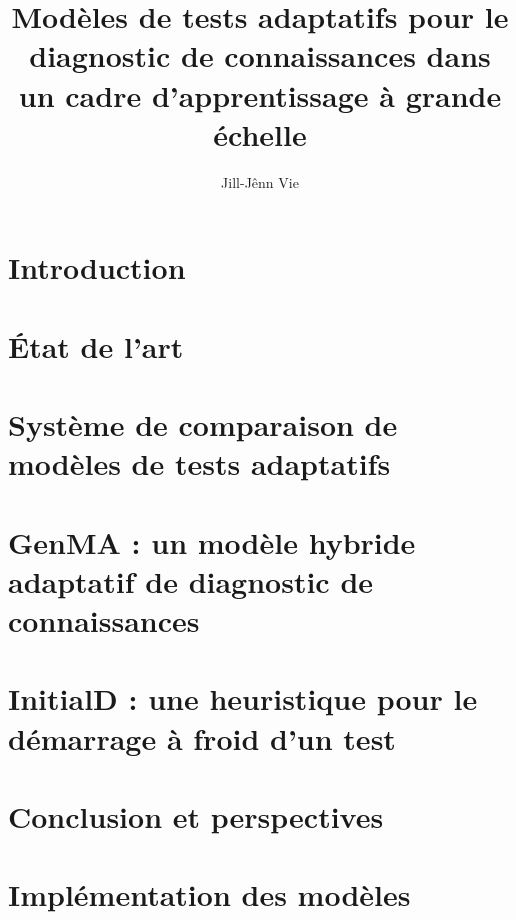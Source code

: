 \documentclass[12pt,a4paper]{book}
\title{Modèles de tests adaptatifs pour le diagnostic de connaissances dans un cadre d'apprentissage à grande échelle}
\author{Jill-Jênn Vie}
\begin{document}

\restoregeometry

%

\printglossaries
\printnomenclature

\clearpage
\tableofcontents

\chapter{Introduction}


\chapter{État de l'art}


\chapter{Système de comparaison de modèles de tests adaptatifs}



\chapter{GenMA : un modèle hybride adaptatif de diagnostic de connaissances}




\chapter{InitialD : une heuristique pour le démarrage à froid d'un test}

%


\chapter{Conclusion et perspectives}


%

\clearpage
\listoffigures
\listoftables

\appendix

\chapter{Implémentation des modèles}


\nocite{*}
\printbibliography
\end{document}
